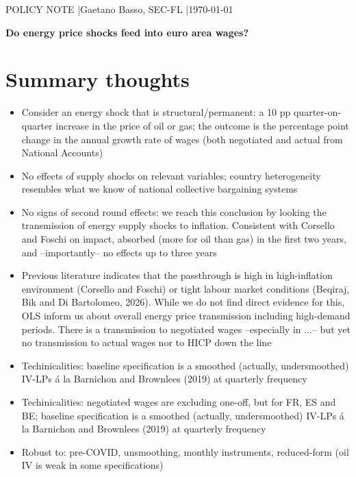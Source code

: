 \documentclass[11pt,a4paper]{article}
\begin{document}
{\small POLICY NOTE \quad|\quad Gaetano Basso, SEC-FL \quad|\quad \today}\par
\vspace{0.4em}
{\LARGE\bfseries Do energy price shocks feed into euro area wages?}\par
\vspace{0.8em}

\section*{Summary thoughts}
\begin{itemize}
\item Consider an energy shock that is structural/permanent: a 10 pp quarter-on-quarter increase in the price of oil or gas; the outcome is the percentage point change in the annual growth rate of wages (both negotiated and actual from National Accounts)
\item No effects of supply shocks on relevant variables; country heterogeneity resembles what we know of national collective bargaining systems
\item No signs of second round effects: we reach this conclusion by looking the transmission of energy supply shocks to inflation. Consistent with Corsello and Foschi on impact, absorbed (more for oil than gas) in the first two years, and --importantly-- no effects up to three years
\item Previous literature indicates that the passthrough is high in high-inflation environment (Corsello and Foschi) or tight labour market conditions (Beqiraj, Bik and Di Bartolomeo, 2026). While we do not find direct evidence for this, OLS inform us about overall energy price transmission including high-demand periods. There is a transmission to negotiated wages --especially in ...-- but yet no transmission to actual wages nor to HICP down the line
\item Techinicalities: baseline specification is a smoothed (actually, undersmoothed) IV-LPs \'{a} la Barnichon and Brownlees (2019) at quarterly frequency 
\item Techinicalities: negotiated wages are excluding one-off, but for FR, ES and BE; baseline specification is a smoothed (actually, undersmoothed) IV-LPs \'{a} la Barnichon and Brownlees (2019) at quarterly frequency 
\item Robust to: pre-COVID, unsmoothing, monthly instruments, reduced-form (oil IV is weak in some specifications)
\end{itemize}
\end{document}
